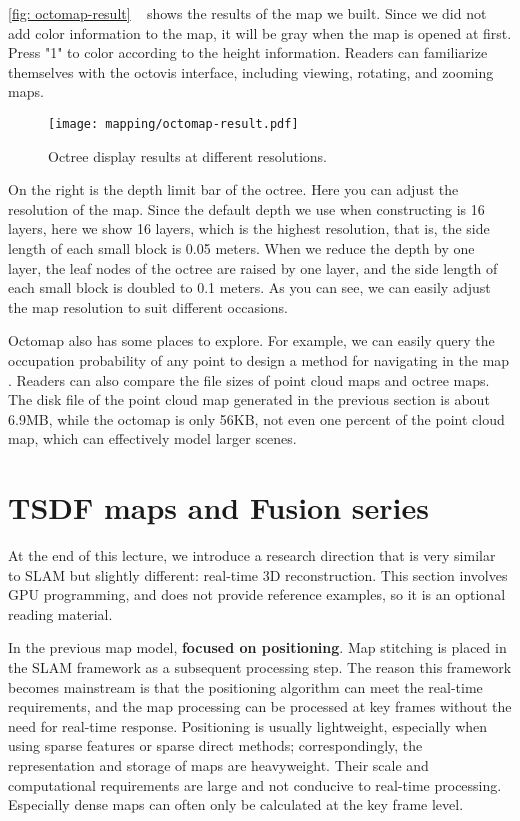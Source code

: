 \autoref{fig: octomap-result} ~ shows the results of the map we built. Since we did not add color information to the map, it will be gray when the map is opened at first. Press "1" to color according to the height information. Readers can familiarize themselves with the octovis interface, including viewing, rotating, and zooming maps.

\begin{figure}[! htp]
\centering
\texttt{[image: mapping/octomap-result.pdf]}
\caption{Octree display results at different resolutions. }
\label{fig: octomap-result}
\end{figure}

On the right is the depth limit bar of the octree. Here you can adjust the resolution of the map. Since the default depth we use when constructing is 16 layers, here we show 16 layers, which is the highest resolution, that is, the side length of each small block is 0.05 meters. When we reduce the depth by one layer, the leaf nodes of the octree are raised by one layer, and the side length of each small block is doubled to 0.1 meters. As you can see, we can easily adjust the map resolution to suit different occasions.

Octomap also has some places to explore. For example, we can easily query the occupation probability of any point to design a method for navigating in the map \textsuperscript{\cite{Burri2015}}. Readers can also compare the file sizes of point cloud maps and octree maps. The disk file of the point cloud map generated in the previous section is about 6.9MB, while the octomap is only 56KB, not even one percent of the point cloud map, which can effectively model larger scenes.

\section{\textsuperscript{\ttfamily *} TSDF maps and Fusion series}

At the end of this lecture, we introduce a research direction that is very similar to SLAM but slightly different: real-time 3D reconstruction. This section involves GPU programming, and does not provide reference examples, so it is an optional reading material.

In the previous map model, \textbf{focused on positioning}. Map stitching is placed in the SLAM framework as a subsequent processing step. The reason this framework becomes mainstream is that the positioning algorithm can meet the real-time requirements, and the map processing can be processed at key frames without the need for real-time response. Positioning is usually lightweight, especially when using sparse features or sparse direct methods; correspondingly, the representation and storage of maps are heavyweight. Their scale and computational requirements are large and not conducive to real-time processing. Especially dense maps can often only be calculated at the key frame level.

